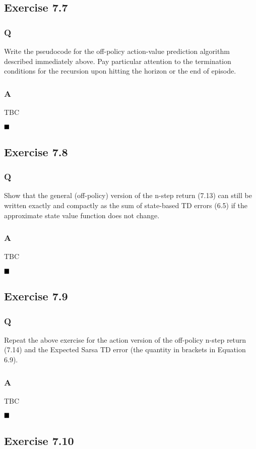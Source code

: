 \subsection{Exercise 7.7}
\subsubsection{Q}
Write the pseudocode for the off-policy action-value prediction algorithm described immediately above. Pay particular attention to the termination conditions for the recursion upon hitting the horizon or the end of episode.
\subsubsection{A}
TBC

$
\hfill \blacksquare
$

\subsection{Exercise 7.8}
\subsubsection{Q}
Show that the general (off-policy) version of the n-step return (7.13) can still be written exactly and compactly as the sum of state-based TD errors (6.5) if the approximate state value function does not change.
\subsubsection{A}
TBC

$
\hfill \blacksquare
$

\subsection{Exercise 7.9}
\subsubsection{Q}
Repeat the above exercise for the action version of the off-policy n-step return (7.14) and the Expected Sarsa TD error (the quantity in brackets in Equation 6.9).
\subsubsection{A}
TBC

$
\hfill \blacksquare
$

\subsection{Exercise 7.10}
